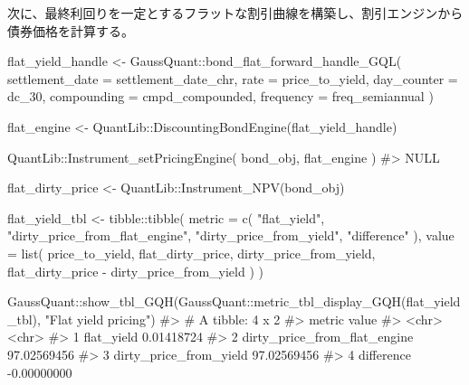 \documentclass[
  letterpaper,
  DIV=11,
  numbers=noendperiod]{scrreprt}
\newenvironment{Shaded}{\begin{snugshade}}{\end{snugshade}}
\newcommand{\AttributeTok}[1]{\textcolor[rgb]{0.40,0.45,0.13}{#1}}
\newcommand{\CommentTok}[1]{\textcolor[rgb]{0.37,0.37,0.37}{#1}}
\newcommand{\FunctionTok}[1]{\textcolor[rgb]{0.28,0.35,0.67}{#1}}
\newcommand{\NormalTok}[1]{\textcolor[rgb]{0.00,0.23,0.31}{#1}}
\newcommand{\OtherTok}[1]{\textcolor[rgb]{0.00,0.23,0.31}{#1}}
\newcommand{\SpecialCharTok}[1]{\textcolor[rgb]{0.37,0.37,0.37}{#1}}
\newcommand{\StringTok}[1]{\textcolor[rgb]{0.13,0.47,0.30}{#1}}
\begin{document}
次に、最終利回りを一定とするフラットな割引曲線を構築し、割引エンジンから債券価格を計算する。

\begin{Shaded}
\begin{Highlighting}[]
\NormalTok{flat\_yield\_handle }\OtherTok{\textless{}{-}}\NormalTok{ GaussQuant}\SpecialCharTok{::}\FunctionTok{bond\_flat\_forward\_handle\_GQL}\NormalTok{(}
  \AttributeTok{settlement\_date =}\NormalTok{ settlement\_date\_chr,}
  \AttributeTok{rate =}\NormalTok{ price\_to\_yield,}
  \AttributeTok{day\_counter =}\NormalTok{ dc\_30,}
  \AttributeTok{compounding =}\NormalTok{ cmpd\_compounded,}
  \AttributeTok{frequency =}\NormalTok{ freq\_semiannual}
\NormalTok{)}

\NormalTok{flat\_engine }\OtherTok{\textless{}{-}}\NormalTok{ QuantLib}\SpecialCharTok{::}\FunctionTok{DiscountingBondEngine}\NormalTok{(flat\_yield\_handle)}

\NormalTok{QuantLib}\SpecialCharTok{::}\FunctionTok{Instrument\_setPricingEngine}\NormalTok{(}
\NormalTok{  bond\_obj,}
\NormalTok{  flat\_engine}
\NormalTok{)}
\CommentTok{\#\textgreater{} NULL}

\NormalTok{flat\_dirty\_price }\OtherTok{\textless{}{-}}\NormalTok{ QuantLib}\SpecialCharTok{::}\FunctionTok{Instrument\_NPV}\NormalTok{(bond\_obj)}

\NormalTok{flat\_yield\_tbl }\OtherTok{\textless{}{-}}\NormalTok{ tibble}\SpecialCharTok{::}\FunctionTok{tibble}\NormalTok{(}
  \AttributeTok{metric =} \FunctionTok{c}\NormalTok{(}
    \StringTok{"flat\_yield"}\NormalTok{,}
    \StringTok{"dirty\_price\_from\_flat\_engine"}\NormalTok{,}
    \StringTok{"dirty\_price\_from\_yield"}\NormalTok{,}
    \StringTok{"difference"}
\NormalTok{  ),}
  \AttributeTok{value =} \FunctionTok{list}\NormalTok{(}
\NormalTok{    price\_to\_yield,}
\NormalTok{    flat\_dirty\_price,}
\NormalTok{    dirty\_price\_from\_yield,}
\NormalTok{    flat\_dirty\_price }\SpecialCharTok{{-}}\NormalTok{ dirty\_price\_from\_yield}
\NormalTok{  )}
\NormalTok{)}

\NormalTok{GaussQuant}\SpecialCharTok{::}\FunctionTok{show\_tbl\_GQH}\NormalTok{(GaussQuant}\SpecialCharTok{::}\FunctionTok{metric\_tbl\_display\_GQH}\NormalTok{(flat\_yield\_tbl), }\StringTok{"Flat yield pricing"}\NormalTok{)}
\CommentTok{\#\textgreater{} \# A tibble: 4 x 2}
\CommentTok{\#\textgreater{}   metric                       value      }
\CommentTok{\#\textgreater{}   \textless{}chr\textgreater{}                        \textless{}chr\textgreater{}      }
\CommentTok{\#\textgreater{} 1 flat\_yield                   0.01418724 }
\CommentTok{\#\textgreater{} 2 dirty\_price\_from\_flat\_engine 97.02569456}
\CommentTok{\#\textgreater{} 3 dirty\_price\_from\_yield       97.02569456}
\CommentTok{\#\textgreater{} 4 difference                   {-}0.00000000}
\end{Highlighting}
\end{Shaded}
\end{document}
